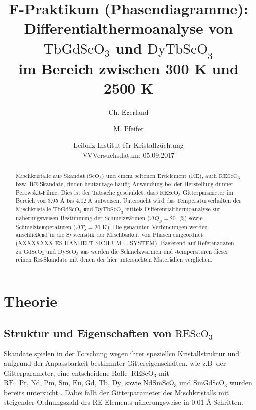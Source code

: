 \documentclass[aps,twocolumn,secnumarabic,nobalancelastpage,amsmath,amssymb,
nofootinbib,superscriptaddress]{revtex4-1}
\begin{document}
\title{F-Praktikum (Phasendiagramme):\\Differentialthermoanalyse von $\text{TbGdScO}_3$
und $\text{DyTbScO}_3$\\im Bereich zwischen 300 K und 2500 K}
\author         {Ch. Egerland}
\author         {M. Pfeifer}
\date[Versuchsort: ]{Leibniz-Institut für Kristallzüchtung \\ VVVersuchsdatum: 05.09.2017}


\begin{abstract}
Mischkristalle aus Skandat ($\text{ScO}_3$) und einem seltenen Erdelement (RE), auch $\text{REScO}_3$ bzw. RE-Skandate, finden heutzutage häufig Anwendung bei der Herstellung
dünner Perowskit-Filme. Dies ist der Tatsache geschuldet, dass $\text{REScO}_3$ Gitterparameter im Bereich von 3.95 \AA$\text{ bis}$ 4.02 \AA$\text{ aufweisen.}$
 Untersucht wird das Temperaturverhalten der Mischkristalle $\text{TbGdScO}_3$ und $\text{DyTbScO}_3$ mittels
Differentialthermoanalyse zur näherungsweisen Bestimmung der Schmelzwärmen ($\Delta Q_S=20\text{ }\%$) sowie Schmelztemperaturen ($\Delta T_S=20\text{ K}$).
Die genannten Verbindungen werden anschließend in die Systematik der Mischbarkeit von Phasen eingeordnet (XXXXXXXX ES HANDELT SICH UM ... SYSTEM).
Basierend auf Referenzdaten zu $\text{Gd}\text{ScO}_3$ und $\text{Dy}\text{ScO}_3$ aus \cite{paperK} werden die Schmelzwärmen und -temperaturen dieser
reinen RE-Skandate mit denen der hier untersuchten Materialien verglichen.
\end{abstract}


\maketitle


\section{Theorie}
\subsection{Struktur und Eigenschaften von $\text{REScO}_3$}
\noindent Skandate spielen in der Forschung wegen ihrer speziellen Kristallstruktur und aufgrund der Anpassbarkeit bestimmter Gittereigenschaften, wie z.B. der
Gitterparameter, eine entscheidene Rolle. $\text{REScO}_3$ mit $\text{RE=Pr, Nd, Pm, Sm, Eu, Gd, Tb, Dy}$, sowie $\text{NdSmScO}_3$ und $\text{SmGdScO}_3$ wurden bereits untersucht \cite{paperK}.
Dabei fällt der Gitterparameter des Mischkristalls mit steigender Ordnungszahl des RE-Elements näherungsweise in 0.01 \AA-Schritten. \cite{paperK}
\end{document}
